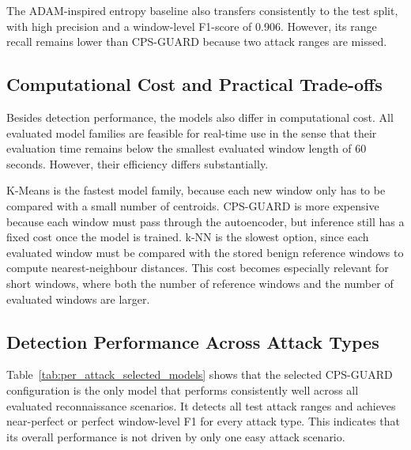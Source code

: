 The ADAM-inspired entropy baseline also transfers consistently to the test split, with high precision and a window-level F1-score of 0.906. However, its range recall remains lower than CPS-GUARD because two attack ranges are missed.


\subsection{Computational Cost and Practical Trade-offs}
\label{sec:computational_tradeoffs}

Besides detection performance, the models also differ in computational cost. All evaluated model families are feasible for real-time use in the sense that their evaluation time remains below the smallest evaluated window length of 60 seconds. However, their efficiency differs substantially. 

K-Means is the fastest model family, because each new window only has to be compared with a small number of centroids. CPS-GUARD is more expensive because each window must pass through the autoencoder, but inference still has a fixed cost once the model is trained. k-NN is the slowest option, since each evaluated window must be compared with the stored benign reference windows to compute nearest-neighbour distances. This cost becomes especially relevant for short windows, where both the number of reference windows and the number of evaluated windows are larger.






\subsection{Detection Performance Across Attack Types}
Table~\ref{tab:per_attack_selected_models} shows that the selected CPS-GUARD configuration is the only model that performs consistently well across all evaluated reconnaissance scenarios. It detects all test attack ranges and achieves near-perfect or perfect window-level F1 for every attack type. This indicates that its overall performance is not driven by only one easy attack scenario.

